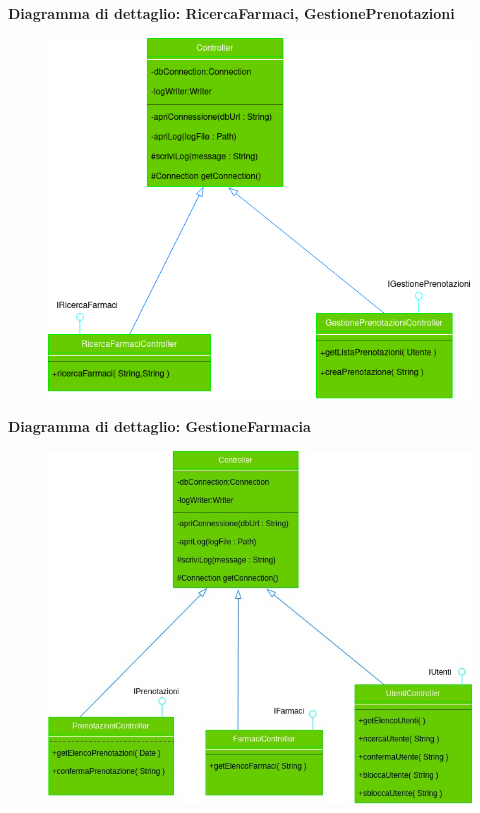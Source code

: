 \textbf{Diagramma di dettaglio: RicercaFarmaci, GestionePrenotazioni}
\begin{figure}[h!]
    \begin{center}
        \includegraphics[width=\textwidth]{immagini/ControllerCliente-progettazione.png}
    \end{center}
\end{figure}

\newpage

\textbf{Diagramma di dettaglio: GestioneFarmacia}
\begin{figure}[h!]
    \begin{center}
        \includegraphics[width=\textwidth]{immagini/DettaglioFarmacia-ControllerFarmacia.jpg}
    \end{center}
\end{figure}

